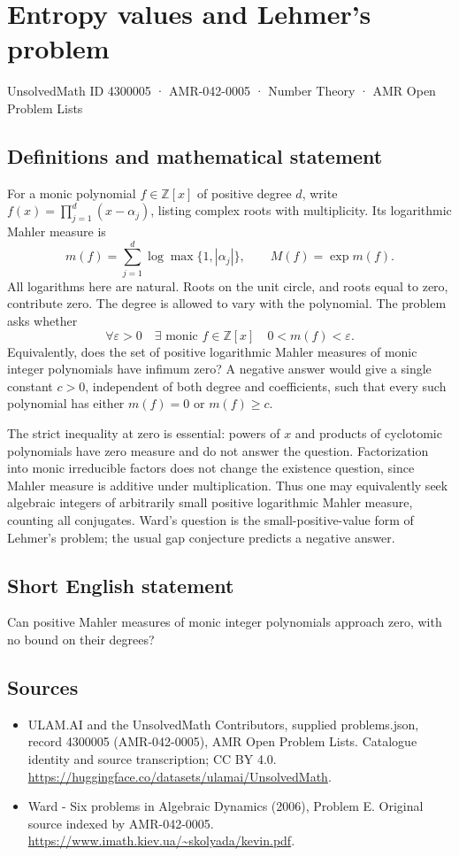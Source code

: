 \documentclass[11pt,a4paper]{article}
\begin{document}
\section*{Entropy values and Lehmer's problem}\label{4300005}
{\small UnsolvedMath ID 4300005 · AMR-042-0005 · Number Theory · AMR Open Problem Lists}
\subsection{Definitions and mathematical statement}
For a monic polynomial $f\in\mathbb Z[x]$ of positive degree $d$, write
$f(x)=\prod_{j=1}^d(x-\alpha_j)$, listing complex roots with multiplicity.
Its logarithmic Mahler measure is
\[
 m(f)=\sum_{j=1}^d\log\max\{1,|\alpha_j|\},
 \qquad M(f)=\exp m(f).
\]
All logarithms here are natural. Roots on the unit circle, and roots equal to
zero, contribute zero. The degree is allowed to vary with the polynomial.
The problem asks whether
\[
 \forall\varepsilon>0\quad\exists\text{ monic }f\in\mathbb Z[x]
 \quad 0<m(f)<\varepsilon.
\]
Equivalently, does the set of positive logarithmic Mahler measures of monic
integer polynomials have infimum zero? A negative answer would give a single
constant $c>0$, independent of both degree and coefficients, such that every
such polynomial has either $m(f)=0$ or $m(f)\ge c$.

The strict inequality at zero is essential: powers of $x$ and products of
cyclotomic polynomials have zero measure and do not answer the question.
Factorization into monic irreducible factors does not change the existence
question, since Mahler measure is additive under multiplication. Thus one may
equivalently seek algebraic integers of arbitrarily small positive logarithmic
Mahler measure, counting all conjugates. Ward's question is the small-positive-value
form of Lehmer's problem; the usual gap conjecture predicts a negative answer.
\subsection{Short English statement}
Can positive Mahler measures of monic integer polynomials approach zero, with no bound on their degrees?
\subsection{Sources}
\begin{itemize}
\item[S1] ULAM.AI and the UnsolvedMath Contributors, supplied problems.json, record 4300005 (AMR-042-0005), AMR Open Problem Lists. Catalogue identity and source transcription; CC BY 4.0.
\url{https://huggingface.co/datasets/ulamai/UnsolvedMath}.
\item[S2] Ward - Six problems in Algebraic Dynamics (2006), Problem E. Original source indexed by AMR-042-0005.
\url{https://www.imath.kiev.ua/~skolyada/kevin.pdf}.
\end{itemize}
\end{document}
